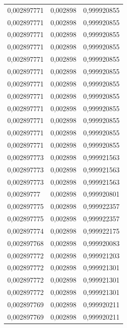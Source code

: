 \begin{center}
\begin{longtable}{|l|l|l|}
0,002897771        & 0,002898              & 0,999920855  \\
0,002897771        & 0,002898              & 0,999920855  \\
0,002897771        & 0,002898              & 0,999920855  \\
0,002897771        & 0,002898              & 0,999920855  \\
0,002897771        & 0,002898              & 0,999920855  \\
0,002897771        & 0,002898              & 0,999920855  \\
0,002897771        & 0,002898              & 0,999920855  \\
0,002897771        & 0,002898              & 0,999920855  \\
0,002897771        & 0,002898              & 0,999920855  \\
0,002897771        & 0,002898              & 0,999920855  \\
0,002897771        & 0,002898              & 0,999920855  \\
0,002897771        & 0,002898              & 0,999920855  \\
0,002897773        & 0,002898              & 0,999921563  \\
0,002897773        & 0,002898              & 0,999921563  \\
0,002897773        & 0,002898              & 0,999921563  \\
0,00289777         & 0,002898              & 0,999920801  \\
0,002897775        & 0,002898              & 0,999922357  \\
0,002897775        & 0,002898              & 0,999922357  \\
0,002897774        & 0,002898              & 0,999922175  \\
0,002897768        & 0,002898              & 0,999920083  \\
0,002897772        & 0,002898              & 0,999921203  \\
0,002897772        & 0,002898              & 0,999921301  \\
0,002897772        & 0,002898              & 0,999921301  \\
0,002897772        & 0,002898              & 0,999921301  \\
0,002897769        & 0,002898              & 0,999920211  \\
0,002897769        & 0,002898              & 0,999920211  \\

\end{longtable}
\end{center}
